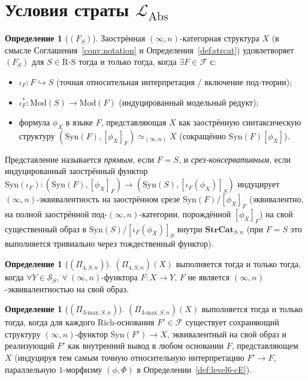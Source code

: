 \documentclass[11pt]{article}
\theoremstyle{plain}
\theoremstyle{definition}
\newtheorem{definition}[theorem]{Определение}
\newcommand{\RS}{\mathrm{R\text{-}S}}
\newcommand{\cS}{\mathcal{S}}
\newcommand{\cF}{\mathcal{F}}
\newcommand{\LAbs}{\mathcal{L}_{\mathrm{Abs}}}
\newcommand{\Syn}{\mathrm{Syn}}
\newcommand{\Mod}{\mathrm{Mod}}
\begin{document}
\section{\texorpdfstring{Условия страты $\LAbs$}{Условия страты L\_Abs}}\label{sec:conditions}

\begin{definition}[$(F_S)$]\label{def:F}
Заострённая $(\infty, n)$-категорная структура $X$ (в смысле Соглашения~\ref{conv:notation} и Определения~\ref{def:strcat}) удовлетворяет $(F_S)$ для $S \in \RS$ тогда и только тогда, когда $\exists F \in \cF$ с:
\begin{itemize}
\item[\textbf{(F-1)}] $\iota_F : F \hookrightarrow S$ (точная относительная интерпретация / включение под-теории);
\item[\textbf{(F-2)}] $\iota_F^* : \Mod(S) \to \Mod(F)$ (индуцированный модельный редукт);
\item[\textbf{(F-3)}] формула $\phi_X$ в языке $F$, представляющая $X$ как заострённую синтаксическую структуру $(\Syn(F), [\phi_X]_F) \simeq_{(\infty, n)} X$ (сокращённо $\Syn(F)[\phi_X]$).
\end{itemize}
Представление называется \emph{прямым}, если $F = S$, и \emph{срез-консервативным}, если индуцированный заострённый функтор $\Syn(\iota_F) : (\Syn(F), [\phi_X]_F) \to (\Syn(S), [\iota_F(\phi_X)]_S)$ индуцирует $(\infty, n)$-эквивалентность на заострённом срезе $\Syn(F)/[\phi_X]_F$ (эквивалентно, на полной заострённой под-$(\infty, n)$-категории, порождённой $[\phi_X]_F$) на свой существенный образ в $\Syn(S)/[\iota_F(\phi_X)]_S$ внутри $\mathbf{StrCat}_{S, n}$ (при $F = S$ это выполняется тривиально через тождественный функтор).
\end{definition}

\begin{definition}[$(\Pi_{4, S, n})$]\label{def:pi4}
$(\Pi_{4, S, n})(X)$ выполняется тогда и только тогда, когда $\forall Y \in \cS_S,\ \forall\ (\infty, n)$-функтора $F : X \to Y$, $F$ не является $(\infty, n)$-эквивалентностью на свой образ.
\end{definition}

\begin{definition}[$(\Pi_{3\text{-max}, S, n})$]\label{def:pi3max}
$(\Pi_{3\text{-max}, S, n})(X)$ выполняется тогда и только тогда, когда для каждого Rich-основания $F' \in \cF$ существует сохраняющий структуру $(\infty, n)$-функтор $\Syn(F') \to X$, эквивалентный на свой образ и реализующий $F'$ как внутренний вывод в любом основании $F$, представляющем $X$ (индуцируя тем самым точную относительную интерпретацию $F' \to F$, параллельную $1$-морфизму $(\phi, \Phi)$ в Определении~\ref{def:level6-cE}).
\end{definition}
\end{document}
